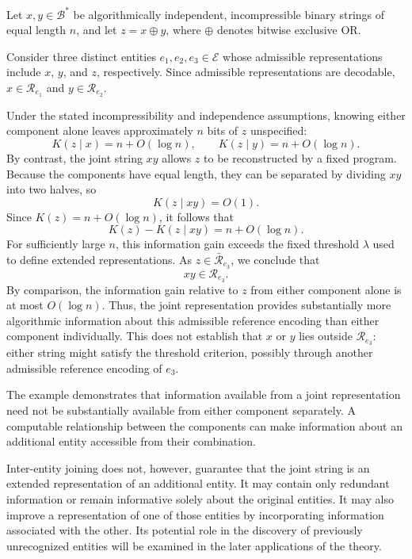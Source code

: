 \begin{example}
Let $x,y\in\mathcal{B}^\ast$ be algorithmically independent, incompressible binary strings of equal length $n$, and let $z=x\oplus y$, where $\oplus$ denotes bitwise exclusive OR.

Consider three distinct entities $e_1,e_2,e_3\in\mathcal{E}$ whose admissible representations include $x$, $y$, and $z$, respectively. Since admissible representations are decodable, $x\in\mathcal{R}_{e_1}$ and $y\in\mathcal{R}_{e_2}$.

Under the stated incompressibility and independence assumptions, knowing either component alone leaves approximately $n$ bits of $z$ unspecified:
\[
K(z\mid x)=n+O(\log n),
\qquad
K(z\mid y)=n+O(\log n).
\]
By contrast, the joint string $xy$ allows $z$ to be reconstructed by a fixed program. Because the components have equal length, they can be separated by dividing $xy$ into two halves, so
\[
K(z\mid xy)=O(1).
\]
Since $K(z)=n+O(\log n)$, it follows that
\[
K(z)-K(z\mid xy)=n+O(\log n).
\]
For sufficiently large $n$, this information gain exceeds the fixed threshold $\lambda$ used to define extended representations. As $z\in\bar{\mathcal{R}}_{e_3}$, we conclude that
\[
xy\in\mathcal{R}_{e_3}.
\]
By comparison, the information gain relative to $z$ from either component alone is at most $O(\log n)$. Thus, the joint representation provides substantially more algorithmic information about this admissible reference encoding than either component individually. This does not establish that $x$ or $y$ lies outside $\mathcal{R}_{e_3}$: either string might satisfy the threshold criterion, possibly through another admissible reference encoding of $e_3$.
\end{example}

The example demonstrates that information available from a joint representation need not be substantially available from either component separately. A computable relationship between the components can make information about an additional entity accessible from their combination.

Inter-entity joining does not, however, guarantee that the joint string is an extended representation of an additional entity. It may contain only redundant information or remain informative solely about the original entities. It may also improve a representation of one of those entities by incorporating information associated with the other. Its potential role in the discovery of previously unrecognized entities will be examined in the later applications of the theory.

